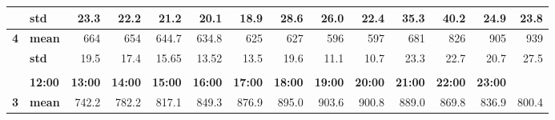 \begin{table}[htbp]
\begin{tabular}{|c|l|r|r|r|r|r|r|r|r|r|r|r|r|}
\cline{2-14}    \rowcolor[rgb]{ .553,  .706,  .886}      & \textbf{std} & \cellcolor[rgb]{ .851,  .851,  .851} 23.3 & \cellcolor[rgb]{ .851,  .851,  .851} 22.2 & \cellcolor[rgb]{ .851,  .851,  .851} 21.2 & \cellcolor[rgb]{ .851,  .851,  .851} 20.1 & \cellcolor[rgb]{ .851,  .851,  .851} 18.9 & \cellcolor[rgb]{ .851,  .851,  .851} 28.6 & \cellcolor[rgb]{ .851,  .851,  .851} 26.0 & \cellcolor[rgb]{ .851,  .851,  .851} 22.4 & \cellcolor[rgb]{ .851,  .851,  .851} 35.3 & \cellcolor[rgb]{ .851,  .851,  .851} 40.2 & \cellcolor[rgb]{ .851,  .851,  .851} 24.9 & \cellcolor[rgb]{ .851,  .851,  .851} 23.8 \bigstrut\\
    \hline
    \rowcolor[rgb]{ .553,  .706,  .886} \textbf{4} & \textbf{mean} & \cellcolor[rgb]{ 1,  1,  1} 664 & \cellcolor[rgb]{ 1,  1,  1} 654 & \cellcolor[rgb]{ 1,  1,  1} 644.7 & \cellcolor[rgb]{ 1,  1,  1} 634.8 & \cellcolor[rgb]{ 1,  1,  1} 625 & \cellcolor[rgb]{ 1,  1,  1} 627 & \cellcolor[rgb]{ 1,  1,  1} 596 & \cellcolor[rgb]{ 1,  1,  1} 597 & \cellcolor[rgb]{ 1,  1,  1} 681 & \cellcolor[rgb]{ 1,  1,  1} 826 & \cellcolor[rgb]{ 1,  1,  1} 905 & \cellcolor[rgb]{ 1,  1,  1} 939 \bigstrut\\
\cline{2-14}    \rowcolor[rgb]{ .553,  .706,  .886}      & \textbf{std} & \cellcolor[rgb]{ 1,  1,  1} 19.5 & \cellcolor[rgb]{ 1,  1,  1} 17.4 & \cellcolor[rgb]{ 1,  1,  1} 15.65 & \cellcolor[rgb]{ 1,  1,  1} 13.52 & \cellcolor[rgb]{ 1,  1,  1} 13.5 & \cellcolor[rgb]{ 1,  1,  1} 19.6 & \cellcolor[rgb]{ 1,  1,  1} 11.1 & \cellcolor[rgb]{ 1,  1,  1} 10.7 & \cellcolor[rgb]{ 1,  1,  1} 23.3 & \cellcolor[rgb]{ 1,  1,  1} 22.7 & \cellcolor[rgb]{ 1,  1,  1} 20.7 & \cellcolor[rgb]{ 1,  1,  1} 27.5 \bigstrut\\
    \hline
    \multicolumn{1}{r}{} & \multicolumn{1}{r}{} & \multicolumn{1}{r}{} & \multicolumn{1}{r}{} & \multicolumn{1}{r}{} & \multicolumn{1}{r}{} & \multicolumn{1}{r}{} & \multicolumn{1}{r}{} & \multicolumn{1}{r}{} & \multicolumn{1}{r}{} & \multicolumn{1}{r}{} & \multicolumn{1}{r}{} & \multicolumn{1}{r}{} & \multicolumn{1}{r}{} \bigstrut\\
    \hline
    \rowcolor[rgb]{ .553,  .706,  .886} \multicolumn{2}{|c|}{\textbf{Profile code}} & \textbf{12:00} & \textbf{13:00} & \textbf{14:00} & \textbf{15:00} & \textbf{16:00} & \textbf{17:00} & \textbf{18:00} & \textbf{19:00} & \textbf{20:00} & \textbf{21:00} & \textbf{22:00} & \textbf{23:00} \bigstrut\\
    \hline
    \rowcolor[rgb]{ .553,  .706,  .886} \textbf{3} & \textbf{mean} & \cellcolor[rgb]{ 1,  1,  1} 742.2 & \cellcolor[rgb]{ 1,  1,  1} 782.2 & \cellcolor[rgb]{ 1,  1,  1} 817.1 & \cellcolor[rgb]{ 1,  1,  1} 849.3 & \cellcolor[rgb]{ 1,  1,  1} 876.9 & \cellcolor[rgb]{ 1,  1,  1} 895.0 & \cellcolor[rgb]{ 1,  1,  1} 903.6 & \cellcolor[rgb]{ 1,  1,  1} 900.8 & \cellcolor[rgb]{ 1,  1,  1} 889.0 & \cellcolor[rgb]{ 1,  1,  1} 869.8 & \cellcolor[rgb]{ 1,  1,  1} 836.9 & \cellcolor[rgb]{ 1,  1,  1} 800.4 \bigstrut\\

\end{tabular}
\end{table}
